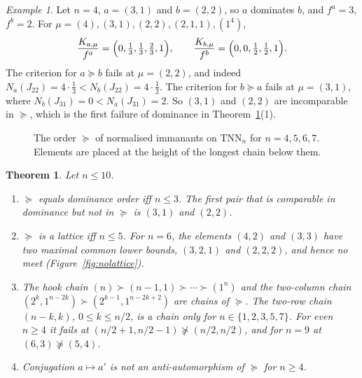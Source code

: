 \documentclass[11pt]{amsart}
\newtheorem{theorem}{Theorem}[section]
\theoremstyle{definition}
\theoremstyle{remark}
\newtheorem{exa}{Example}[section]
\newcommand{\TNN}{\mathrm{TNN}}
\begin{document}
\begin{exa}\label{exa:kostka}
Let $n=4$, $a=(3,1)$ and $b=(2,2)$, so $a$ dominates $b$, and $f^a=3$, $f^b=2$. For $\mu=(4),(3,1),(2,2),(2,1,1),(1^4)$,
\[
\frac{K_{a,\mu}}{f^a}=\Bigl(0,\tfrac13,\tfrac13,\tfrac23,1\Bigr),\qquad \frac{K_{b,\mu}}{f^b}=\Bigl(0,0,\tfrac12,\tfrac12,1\Bigr).
\]
The criterion for $a\succeq b$ fails at $\mu=(2,2)$, and indeed $N_a(J_{22})=4\cdot\frac13<N_b(J_{22})=4\cdot\frac12$. The criterion for $b\succeq a$ fails at $\mu=(3,1)$, where $N_b(J_{31})=0<N_a(J_{31})=2$. So $(3,1)$ and $(2,2)$ are incomparable in $\succeq$, which is the first failure of dominance in Theorem~\ref{thm:structure}(1).
\end{exa}

\begin{figure}[ht]
\centering
\resizebox{0.16\textwidth}{!}{}\hfill
\resizebox{0.18\textwidth}{!}{}\hfill
\resizebox{0.24\textwidth}{!}{}\hfill
\resizebox{0.3\textwidth}{!}{}
\caption{The order $\succeq$ of normalised immanants on $\TNN_n$ for $n=4,5,6,7$. Elements are placed at the height of the longest chain below them.}\label{fig:hasse}
\end{figure}

\begin{theorem}\label{thm:structure}
Let $n\le10$.
\begin{enumerate}
\item $\succeq$ equals dominance order iff $n\le3$. The first pair that is comparable in dominance but not in $\succeq$ is $(3,1)$ and $(2,2)$.
\item $\succeq$ is a lattice iff $n\le5$. For $n=6$, the elements $(4,2)$ and $(3,3)$ have two maximal common lower bounds, $(3,2,1)$ and $(2,2,2)$, and hence no meet (Figure~\ref{fig:nolattice}).
\item The hook chain $(n)\succ(n-1,1)\succ\cdots\succ(1^n)$ and the two-column chain $(2^k,1^{n-2k})\succ(2^{k-1},1^{n-2k+2})$ are chains of $\succeq$. The two-row chain $(n-k,k)$, $0\le k\le n/2$, is a chain only for $n\in\{1,2,3,5,7\}$. For even $n\ge4$ it fails at $(n/2+1,n/2-1)\not\succeq(n/2,n/2)$, and for $n=9$ at $(6,3)\not\succeq(5,4)$.
\item Conjugation $a\mapsto a'$ is not an anti-automorphism of $\succeq$ for $n\ge4$.
\end{enumerate}
\end{theorem}
\end{document}
